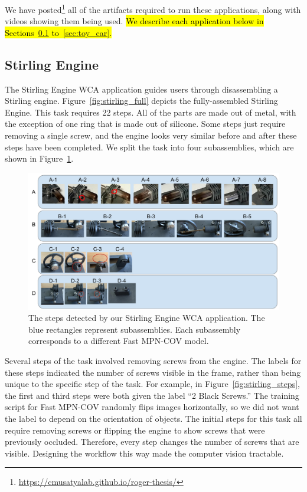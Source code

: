 We have posted\footnote{\url{https://cmusatyalab.github.io/roger-thesis/}} all
of the
artifacts required to run these applications, along with videos showing them
being used.
\hl{
We describe each application below in Sections~{\ref{sec:stirling}}
to~{\ref{sec:toy_car}}.
}

\subsection{Stirling Engine}\label{sec:stirling}

The Stirling Engine WCA application guides users through disassembling a
Stirling engine.
Figure~\ref{fig:stirling_full} depicts the fully-assembled Stirling Engine.
This task requires 22 steps. All of the parts are made out of
metal, with the exception of one ring that is made out of silicone. Some steps
just require removing a single screw, and the engine looks very similar before
and after these steps have been completed.
We split the task into four subassemblies, which are shown in
Figure~\ref{fig:stirling_subs}.

\begin{figure}
  \includegraphics[width=\columnwidth]{figures/stirling_subassemblies.pdf}
  \caption{
    The steps detected by our Stirling Engine WCA application.
    The blue rectangles represent subassemblies.
    Each subassembly corresponds to a different Fast MPN-COV model.
  }\label{fig:stirling_subs}
  \vspace{-0.2in}
\end{figure}

Several steps of the task involved removing screws from the engine.
The labels for these steps indicated the number of screws visible in the frame,
rather than being unique to the specific step of the task.
For example, in Figure~\ref{fig:stirling_steps}, the first and third steps
were both given the label ``2 Black Screws.''
The training script for Fast MPN-COV randomly flips images
horizontally, so we did not want the label to depend on the orientation of
objects.
The initial steps for this task all require removing screws or flipping the
engine to show screws that were previously occluded.
Therefore, every step changes the number of screws that are visible.
Designing the workflow this way made the computer vision tractable.


